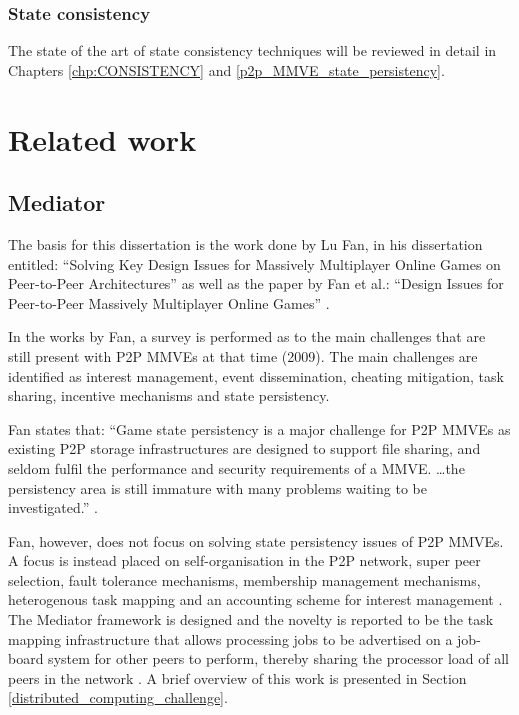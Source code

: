 \subsubsection{State consistency}

The state of the art of state consistency techniques will be reviewed in detail in Chapters \ref{chp:CONSISTENCY} and \ref{p2p_MMVE_state_persistency}.

\section{Related work}
\label{intro_related_work}

\subsection{Mediator}

The basis for this dissertation is the work done by Lu Fan, in his dissertation entitled: ``Solving Key Design Issues for Massively Multiplayer Online Games on Peer-to-Peer Architectures'' \cite{Fan_phd} as well as the paper by Fan et al.: ``Design Issues for Peer-to-Peer Massively Multiplayer Online Games'' \cite{Fan_deisgn_issues_p2p}.

In the works by Fan, a survey is performed as to the main challenges that are still present with P2P MMVEs at that time (2009). The main challenges are identified as interest management, event dissemination, cheating mitigation, task sharing, incentive mechanisms and state persistency.

Fan states that: ``Game state persistency is a major challenge for P2P MMVEs as existing P2P storage infrastructures are designed to support file sharing, and seldom fulfil the performance and security requirements of a MMVE. \ldots the persistency area is still immature with many problems waiting to be investigated.'' \cite{Fan_phd}.

Fan, however, does not focus on solving state persistency issues of P2P MMVEs. A focus is instead placed on self-organisation in the P2P network, super peer selection, fault tolerance mechanisms, membership management mechanisms, heterogenous task mapping and an accounting scheme for interest management \cite{Fan_phd}. The Mediator framework is designed and the novelty is reported to be the task mapping infrastructure that allows processing jobs to be advertised on a job-board system for other peers to perform, thereby sharing the processor load of all peers in the network \cite{fan_mediator_paper}. A brief overview of this work is presented in Section \ref{distributed_computing_challenge}.


